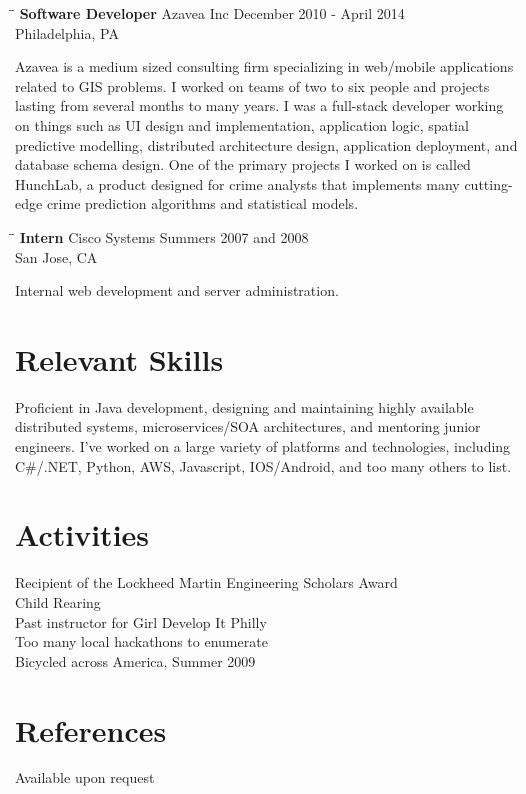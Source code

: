 \documentclass{res}
\begin{document}
\begin{resume}
   
   \begin{tabbing}
   \hspace{2.2in}\= \hspace{2.2in}\= \kill %
    {\bf Software Developer} \>Azavea Inc     \>December 2010 - April 2014\\
                             \>Philadelphia, PA
   \end{tabbing}\vspace{-17pt}      %
   Azavea is a medium sized consulting firm specializing in web/mobile
   applications related to GIS problems.  I worked
   on teams of two to six people and projects lasting from
   several months to many years.  I was a full-stack developer working on
   things such as UI design and implementation, application logic, spatial
   predictive modelling, distributed architecture design, application
   deployment, and database schema design.  One of the primary projects I
   worked on is called HunchLab, a product designed for crime analysts that
   implements many cutting-edge crime prediction algorithms and statistical
   models.
   \begin{tabbing}%
   \hspace{2.2in}\= \hspace{2.2in}\= \kill %
   {\bf Intern}  \> Cisco Systems\> Summers 2007 and 2008\\
                          \> San Jose, CA
   \end{tabbing}\vspace{-17pt}
   Internal web development and server administration.


\section{Relevant Skills}
Proficient in Java development, designing and maintaining highly available distributed systems, microservices/SOA architectures, and mentoring junior engineers.  I've worked on a large variety of platforms and technologies, including C\#/.NET, Python, AWS, Javascript, IOS/Android, and too many others to list.
 
\section{Activities}
    Recipient of the Lockheed Martin Engineering Scholars Award\\
    Child Rearing\\
    Past instructor for Girl Develop It Philly\\
    Too many local hackathons to enumerate\\
    Bicycled across America, Summer 2009

\section{References}
    Available upon request
 
\end{resume}
\end{document}
